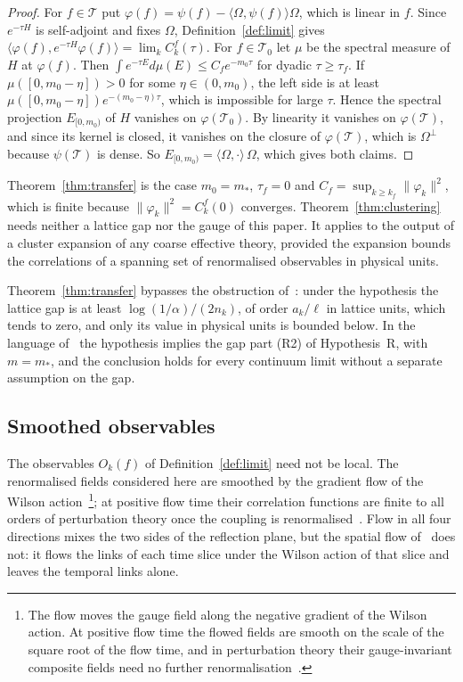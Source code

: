 \documentclass[aps,prd,twocolumn,superscriptaddress,nofootinbib,longbibliography,floatfix,amsmath,amssymb,10pt]{revtex4-2}
\theoremstyle{definition}
\theoremstyle{remark}
\newcommand{\ip}[2]{\langle #1,#2\rangle}
\begin{document}
\begin{proof}
For $f\in\mathcal T$ put $\varphi(f)=\psi(f)-\ip\Omega{\psi(f)}\Omega$,
which is linear in $f$. Since $e^{-\tau H}$ is self-adjoint and fixes
$\Omega$, Definition~\ref{def:limit} gives $\ip{\varphi(f)}{e^{-\tau H}
\varphi(f)}=\lim_kC^f_k(\tau)$. For $f\in\mathcal T_0$ let $\mu$ be the
spectral measure of $H$ at $\varphi(f)$. Then $\int e^{-\tau E}d\mu(E)\le
C_fe^{-m_0\tau}$ for dyadic $\tau\ge\tau_f$. If $\mu([0,m_0-\eta])>0$ for
some $\eta\in(0,m_0)$, the left side is at least $\mu([0,m_0-\eta])e^{-(m_0-
\eta)\tau}$, which is impossible for large $\tau$. Hence the spectral
projection $E_{[0,m_0)}$ of $H$ vanishes on $\varphi(\mathcal T_0)$. By
linearity it vanishes on $\varphi(\mathcal T)$, and since its kernel is
closed, it vanishes on the closure of $\varphi(\mathcal T)$, which is
$\Omega^\perp$ because $\psi(\mathcal T)$ is dense. So $E_{[0,m_0)}=
\ip\Omega\cdot\,\Omega$, which gives both claims.
\end{proof}

Theorem~\ref{thm:transfer} is the case $m_0=m_*$, $\tau_f=0$ and $C_f=
\sup_{k\ge k_f}\|\varphi_k\|^2$, which is finite because $\|\varphi_k\|^2=
C^f_k(0)$ converges. Theorem~\ref{thm:clustering} needs neither a lattice
gap nor the gauge of this paper. It applies to the output of a cluster
expansion of any coarse effective theory, provided the expansion bounds
the correlations of a spanning set of renormalised observables in
physical units.

Theorem~\ref{thm:transfer} bypasses the obstruction of~\cite{BB26b}: under the hypothesis
the lattice gap is at least $\log(1/\alpha)/(2n_k)$, of order $a_k/\ell$ in
lattice units, which tends to zero, and only its value in physical units is
bounded below. In the language of~\cite{BB26b} the hypothesis implies the
gap part (R2) of Hypothesis~R, with $m=m_*$, and the conclusion holds for
every continuum limit without a separate assumption on the gap.

\subsection{Smoothed observables}

The observables $O_k(f)$ of Definition~\ref{def:limit} need not be local.
The renormalised fields considered here are smoothed by the
gradient flow of the Wilson action~\cite{Lus10}\footnote{The flow moves the gauge field along the negative gradient of the Wilson action. At positive flow time the flowed fields are smooth on the scale of the square root of the flow time, and in perturbation theory their gauge-invariant composite fields need no further renormalisation~\cite{Lus10,LW11}.}; at positive flow time their
correlation functions are finite to all orders of perturbation theory once
the coupling is renormalised~\cite{LW11}. Flow in all four directions mixes
the two sides of the reflection plane, but the spatial flow
of~\cite[Sec.~II.B]{SS23} does not: it flows the links of each time slice
under the Wilson action of that slice and leaves the temporal links alone.
\end{document}
